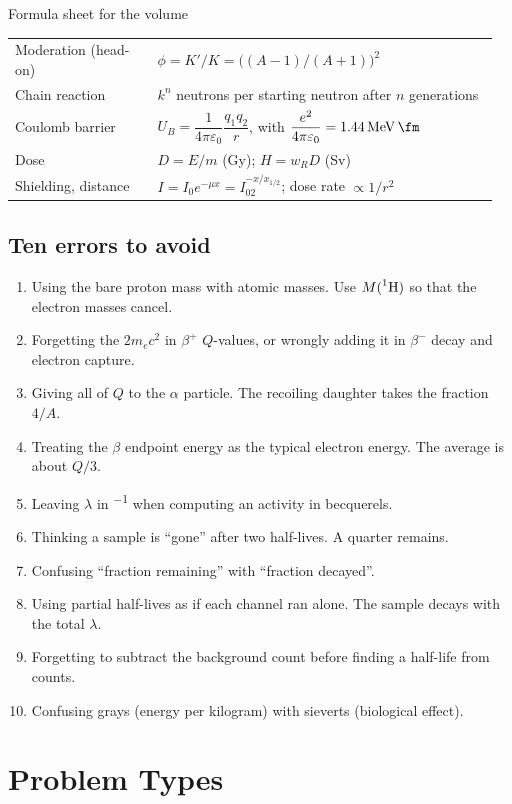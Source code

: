 \begin{tablebox}{Formula sheet for the volume}
\begin{tabular}{@{}p{0.29\linewidth}p{0.67\linewidth}@{}}
Moderation (head-on) & $\phi=K'/K=\big((A-1)/(A+1)\big)^2$\\
Chain reaction & $k^n$ neutrons per starting neutron after $n$ generations\\
Coulomb barrier & $U_B=\dfrac{1}{4\pi\varepsilon_0}\dfrac{q_1q_2}{r}$, with $\dfrac{e^2}{4\pi\varepsilon_0}=\SI{1.44}{\MeV.\fm}$\\
Dose & $D=E/m$ (\si{\gray}); $H=w_RD$ (\si{\sievert})\\
Shielding, distance & $I=I_0e^{-\mu x}=I_02^{-x/x_{1/2}}$; dose rate $\propto1/r^2$\\\bottomrule
\end{tabular}\label{tab:nucapp-formulas}
\end{tablebox}

\subsection*{Ten errors to avoid}
\begin{enumerate}[label=\arabic*.,itemsep=1pt]
\item Using the bare proton mass with atomic masses. Use $M(\prescript{1}{}{\mathrm{H}})$ so that the electron masses cancel.
\item Forgetting the $2m_ec^2$ in $\beta^+$ $Q$-values, or wrongly adding it in $\beta^-$ decay and electron
      capture.
\item Giving all of $Q$ to the $\alpha$ particle. The recoiling daughter takes the fraction $4/A$.
\item Treating the $\beta$ endpoint energy as the typical electron energy. The average is about $Q/3$.
\item Leaving $\lambda$ in \si{\year^{-1}} when computing an activity in becquerels.
\item Thinking a sample is ``gone'' after two half-lives. A quarter remains.
\item Confusing ``fraction remaining'' with ``fraction decayed''.
\item Using partial half-lives as if each channel ran alone. The sample decays with the total $\lambda$.
\item Forgetting to subtract the background count before finding a half-life from counts.
\item Confusing grays (energy per kilogram) with sieverts (biological effect).
\end{enumerate}

\section{Problem Types}\label{sec:types-nucapps}

